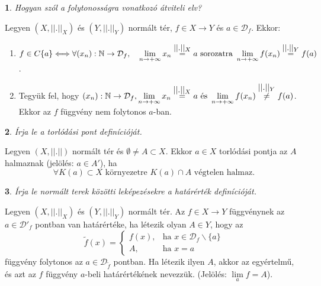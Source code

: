 \documentclass[a4paper]{article}
\def\N{\mathbb{N}}
\theoremstyle{qstyle}
\newtheorem{question}{}{}
\begin{document}
	\begin{question}
		Hogyan szól a folytonosságra vonatkozó átviteli elv?
	\end{question}
	Legyen $(X,||.||_X)$ és $(Y,||.||_Y)$ normált tér, $f\in X\to Y$ és $a\in\mathcal{D}_f$. Ekkor:
	\vspace{-4mm}
	\begin{enumerate}
		\item $f\in C\{a\} \Longleftrightarrow \forall (x_n): \N\to\mathcal{D}_f,\quad \lim\limits_{n\to+\infty}x_n \overset{\hbox{$||.||_X$}}{=}  a \text{ sorozatra } \lim\limits_{n\to+\infty}f(x_n) \overset{\hbox{$||.||_Y$}}{=} f(a)$.
		\item Tegyük fel, hogy $(x_n):\N\to\mathcal{D}_f, \lim\limits_{n\to+\infty}x_n \overset{\hbox{$||.||_X$}}{=}  a \text{ és } \lim\limits_{n\to+\infty}f(x_n) \overset{\hbox{$||.||_Y$}}{\ne} f(a)$. Ekkor az $f$ függvény nem folytonos $a$-ban.
	\end{enumerate}
	\vspace{-4mm}

	\begin{question}
		Írja le a torlódási pont definícióját.
	\end{question}
	Legyen $(X,||.||)$ normált tér és $\emptyset \ne A\subset X$. Ekkor $a\in X$ torlódási pontja az $A$ halmaznak (jelölés: $a\in A'$), ha
	$$\forall K(a)\subset X \text{ környezetre } K(a)\cap A \text{ végtelen halmaz.}$$

	\begin{question}
		Írja le normált terek közötti leképezésekre a határérték definícióját.
	\end{question}
	Legyen $(X,||.||_X)$ és $(Y,||.||_Y)$ normált tér. Az $f \in X\to Y$ függvénynek az $a\in\mathcal{D}'_f$ pontban van határértéke, ha létezik olyan $A\in Y$, hogy az
	$$
	\widetilde{f}(x) = \left\{\begin{array}{rl}
	f(x), & \text{ha } x\in\mathcal{D}_f\backslash\{a\}\\
	A, & \text{ha } x=a
	\end{array}\right.
	$$
	függvény folytonos az $a\in\mathcal{D}_{\widetilde{f}}$ pontban. Ha létezik ilyen $A$, akkor az egyértelmű, és azt az $f$ függvény $a$-beli határértékének nevezzük. (Jelölés: $\lim\limits_{a}f = A$).
\end{document}
